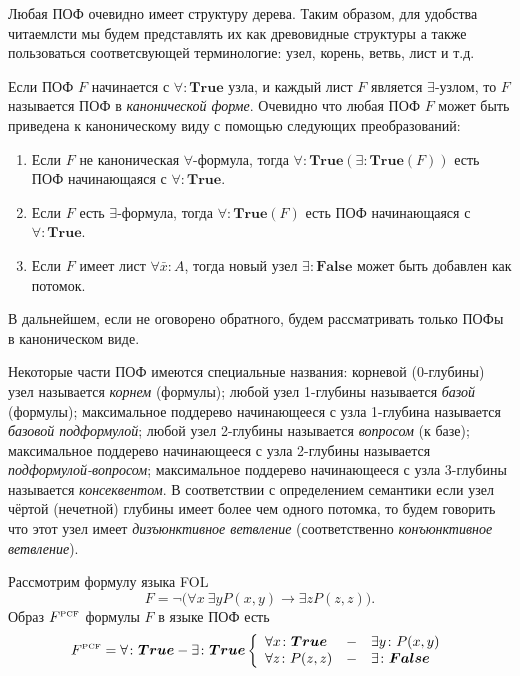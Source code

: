 Любая ПОФ очевидно имеет структуру дерева. Таким образом, для удобства читаемлсти мы будем представлять их как древовидные структуры а также пользоваться соответсвующей терминологие: узел, корень, ветвь, лист и т.д.

Если ПОФ $F$ начинается с $\forall\colon\boldsymbol{True}$ узла, и каждый лист $F$ является $\exists$-узлом, то $F$ называется ПОФ в {\em канонической форме}.
Очевидно что любая ПОФ $F$ может быть приведена к каноническому виду с помощью следующих преобразований:
\begin{enumerate}
\item Если $F$ не каноническая $\forall$-формула, тогда $\forall\colon \boldsymbol{True}\left(\exists\colon \boldsymbol{True}\left(F\right)\right)$ есть ПОФ начинающаяся с $\forall\colon\boldsymbol{True}$.
\item Если $F$ есть $\exists$-формула, тогда $\forall\colon \boldsymbol{True}\left(F\right)$ есть ПОФ начинающаяся с $\forall\colon\boldsymbol{True}$.
\item Если $F$ имеет лист $\forall \bar{x}\colon A$, тогда новый узел $\exists\colon\boldsymbol{False}$ может быть добавлен как потомок.
\end{enumerate}

В дальнейшем, если не оговорено обратного, будем рассматривать только ПОФы в каноническом виде.

Некоторые части ПОФ имеются специальные названия: корневой (0-глубины) узел называется {\em корнем} (формулы); любой узел 1-глубины называется {\em базой} (формулы); максимальное поддерево начинающееся с узла 1-глубина называется {\em базовой подформулой}; любой узел 2-глубины называется {\em вопросом} (к базе); максимальное поддерево начинающееся с узла 2-глубины называется {\em подформулой-вопросом}; максимальное поддерево начинающееся с узла 3-глубины называется {\em консеквентом}. 
В соответствии с определением семантики если узел чёртой (нечетной) глубины имеет более чем одного потомка, то будем говорить что этот узел имеет {\em дизъюнктивное ветвление} (соответственно {\em конъюнктивное ветвление}).

\begin{example}
Рассмотрим формулу языка FOL
$$F= \neg\bigl(\forall x\:\exists y P(x,y)\rightarrow \exists z P(z,z)\bigr).$$
Образ $F^{\text{\tiny{PCF}}}$ формулы $F$ в языке ПОФ есть
$$F^{\text{\tiny{PCF}}} = \forall\colon \boldsymbol{True}-\exists\colon\boldsymbol{True} \left\{
\begin{array}{lcl}
 \forall x\colon\boldsymbol{True} & - & \exists y\colon P(x,y) \\
 \forall z\colon P(z,z) & - & \exists\colon\boldsymbol{False}
\end{array}
\right.$$
 
\end{example}



